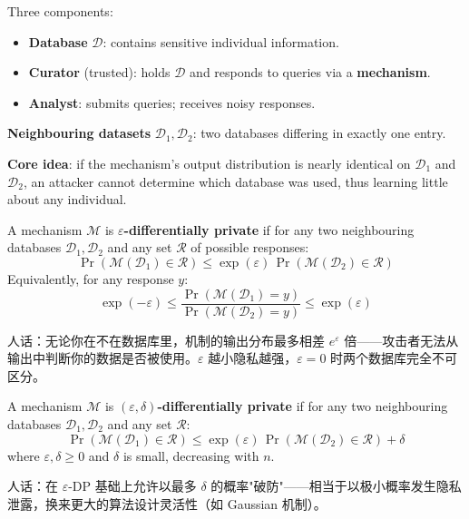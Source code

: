 \documentclass[UTF8]{ctexart}
\begin{document}
Three components:
\begin{itemize}
    \item \textbf{Database} $\mathcal{D}$: contains sensitive individual information.
    \item \textbf{Curator} (trusted): holds $\mathcal{D}$ and responds to queries via a \textbf{mechanism}.
    \item \textbf{Analyst}: submits queries; receives noisy responses.
\end{itemize}

\textbf{Neighbouring datasets} $\mathcal{D}_1, \mathcal{D}_2$: two databases differing in exactly one entry.

\textbf{Core idea}: if the mechanism's output distribution is nearly identical on $\mathcal{D}_1$ and $\mathcal{D}_2$, an attacker cannot determine which database was used, thus learning little about any individual.

\begin{mdframed}[linewidth=1.5pt, linecolor=blue!60, backgroundcolor=blue!5,
    frametitle={\textbf{Definition 1 ($\varepsilon$-DP, Original)}},
    frametitlebackgroundcolor=blue!40, frametitlerule=true]
A mechanism $\mathcal{M}$ is \textbf{$\varepsilon$-differentially private} if for any two neighbouring databases $\mathcal{D}_1, \mathcal{D}_2$ and any set $\mathcal{R}$ of possible responses:
\[
    \Pr\!\left(\mathcal{M}(\mathcal{D}_1) \in \mathcal{R}\right) \leq \exp(\varepsilon)\,\Pr\!\left(\mathcal{M}(\mathcal{D}_2) \in \mathcal{R}\right)
\]
Equivalently, for any response $y$:
\[
    \exp(-\varepsilon) \leq \frac{\Pr(\mathcal{M}(\mathcal{D}_1) = y)}{\Pr(\mathcal{M}(\mathcal{D}_2) = y)} \leq \exp(\varepsilon)
\]
\end{mdframed}
人话：无论你在不在数据库里，机制的输出分布最多相差 $e^\varepsilon$ 倍——攻击者无法从输出中判断你的数据是否被使用。$\varepsilon$ 越小隐私越强，$\varepsilon=0$ 时两个数据库完全不可区分。

\begin{mdframed}[linewidth=1.5pt, linecolor=blue!60, backgroundcolor=blue!5,
    frametitle={\textbf{Definition 2 ($(\varepsilon,\delta)$-DP, Relaxed)}},
    frametitlebackgroundcolor=blue!40, frametitlerule=true]
A mechanism $\mathcal{M}$ is \textbf{$(\varepsilon,\delta)$-differentially private} if for any two neighbouring databases $\mathcal{D}_1, \mathcal{D}_2$ and any set $\mathcal{R}$:
\[
    \Pr\!\left(\mathcal{M}(\mathcal{D}_1) \in \mathcal{R}\right) \leq \exp(\varepsilon)\,\Pr\!\left(\mathcal{M}(\mathcal{D}_2) \in \mathcal{R}\right) + \delta
\]
where $\varepsilon, \delta \geq 0$ and $\delta$ is small, decreasing with $n$.
\end{mdframed}
人话：在 $\varepsilon$-DP 基础上允许以最多 $\delta$ 的概率"破防"——相当于以极小概率发生隐私泄露，换来更大的算法设计灵活性（如 Gaussian 机制）。
\end{document}
